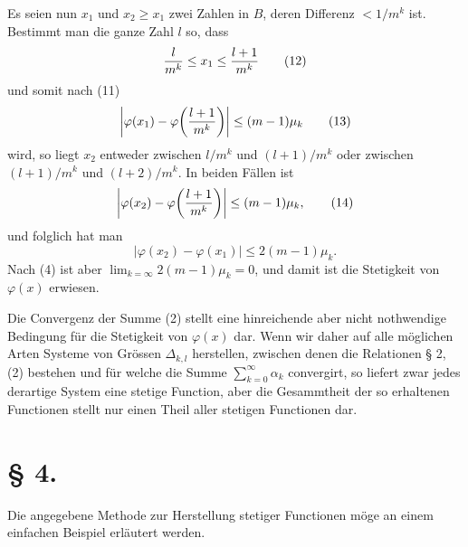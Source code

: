 \documentclass[11pt,a4paper]{article}
\begin{document}
Es seien nun $x_1$ und $x_2\ge x_1$ zwei Zahlen in $B$, deren Differenz $<1/m^k$ ist. Bestimmt man die ganze Zahl $l$ so, dass
\begin{equation}
 {l\over m^k}\le x_1\le {l+1\over m^k}
\tag{12}
\end{equation}
und somit nach (11)
\begin{equation}
 \left|\varphi(x_1)-\varphi\!\left({l+1\over m^k}\right)\right|\le(m-1)\mu_k
\tag{13}
\end{equation}
wird, so liegt $x_2$ entweder zwischen $l/m^k$ und $(l+1)/m^k$ oder zwischen $(l+1)/m^k$ und $(l+2)/m^k$. In beiden Fällen ist
\begin{equation}
 \left|\varphi(x_2)-\varphi\!\left({l+1\over m^k}\right)\right|\le(m-1)\mu_k,
\tag{14}
\end{equation}
und folglich hat man
\begin{equation}
 |\varphi(x_2)-\varphi(x_1)|\le 2(m-1)\mu_k.
\tag{14'}
\end{equation}
Nach (4) ist aber $\lim_{k=\infty}2(m-1)\mu_k=0$, und damit ist die Stetigkeit von $\varphi(x)$ erwiesen.

Die Convergenz der Summe (2) stellt eine hinreichende aber nicht nothwendige Bedingung für die Stetigkeit von $\varphi(x)$ dar. Wenn wir daher auf alle möglichen Arten Systeme von Grössen $\Delta_{k,l}$ herstellen, zwischen denen die Relationen § 2, (2) bestehen und für welche die Summe $\sum_{k=0}^{\infty}\alpha_k$ convergirt, so liefert zwar jedes derartige System eine stetige Function, aber die Gesammtheit der so erhaltenen Functionen stellt nur einen Theil aller stetigen Functionen dar.

\section*{§ 4.}

Die angegebene Methode zur Herstellung stetiger Functionen möge an einem einfachen Beispiel erläutert werden.
\end{document}
